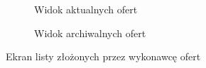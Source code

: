 \begin{figure}[ht!]
\begin{subfigure}[t]{0.32\textwidth}
    \caption{Widok aktualnych ofert}
  \end{subfigure}
  \begin{subfigure}[t]{0.32\textwidth}
    \centering
    \caption{Widok archiwalnych ofert}
  \end{subfigure}
  \caption{Ekran listy złożonych przez wykonawcę ofert}
  \label{fig:offers-expert}
\end{figure}

